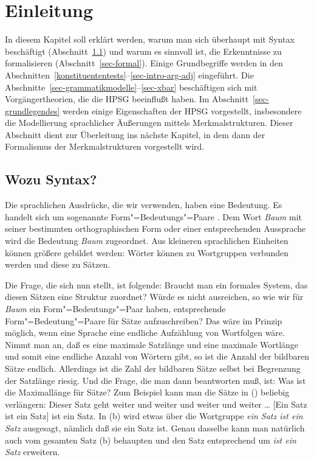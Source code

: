 

\chapter{Einleitung}

In diesem Kapitel soll erklärt werden, warum man sich überhaupt mit Syntax
beschäftigt (Abschnitt~\ref{sec-wozu-syntax}) und 
warum es sinnvoll ist, die Erkenntnisse zu formalisieren (Abschnitt~\ref{sec-formal}).
Einige Grundbegriffe werden in den Abschnitten~\ref{konstituententests}--\ref{sec-intro-arg-adj} eingeführt. 
Die Abschnitte~\ref{sec-grammatikmodelle}--\ref{sec-xbar}
beschäftigen sich mit Vorgängertheorien, die die HPSG beeinflußt haben.
Im Abschnitt~\ref{sec-grundlegendes} werden einige Eigenschaften der HPSG
vorgestellt, insbesondere die Modellierung sprachlicher Äußerungen mittels
Merkmalstrukturen. Dieser Abschnitt dient zur Überleitung ins nächste Kapitel,
in dem dann der Formalismus der Merkmalstrukturen vorgestellt wird.

\section{Wozu Syntax?}
\label{sec-wozu-syntax}

Die sprachlichen Ausdrücke, die wir verwenden, haben eine Bedeutung. Es handelt
sich um sogenannte Form"=Bedeutungs"=Paare \citep{Saussure16a-de}. Dem Wort \emph{Baum}
mit seiner bestimmten orthographischen Form oder einer entsprechenden Aussprache
wird die Bedeutung \emph{Baum} zugeordnet. Aus kleineren sprachlichen Einheiten
können größere gebildet werden: Wörter können zu Wortgruppen verbunden werden
und diese zu Sätzen.

Die Frage, die sich nun stellt, ist folgende: Braucht man ein formales System, das
diesen Sätzen eine Struktur zuordnet? Würde es nicht ausreichen, so wie wir
für \emph{Baum} ein Form"=Bedeutungs"=Paar haben, entsprechende Form"=Bedeutung"=Paare
für Sätze aufzuschreiben? Das wäre im Prinzip möglich, wenn eine Sprache eine
endliche Aufzählung von Wortfolgen wäre. Nimmt man an,
daß es eine maximale Satzlänge und eine maximale Wortlänge und somit eine endliche
Anzahl von Wörtern gibt, so ist die Anzahl der bildbaren Sätze endlich.
Allerdings ist die Zahl der bildbaren Sätze selbst bei Begrenzung der Satzlänge riesig.
Und die Frage, die man dann beantworten muß, ist: Was ist die Maximallänge für
Sätze? Zum Beispiel kann man die Sätze in () beliebig verlängern:
\eal
\ex Dieser Satz geht weiter und weiter und weiter und weiter \ldots
\ex {}[Ein Satz ist ein Satz] ist ein Satz.
\zl
In (b) wird etwas über die Wortgruppe \emph{ein Satz ist ein Satz} ausgesagt, nämlich daß sie
ein Satz ist. Genau dasselbe kann man natürlich auch vom gesamten Satz (b) behaupten und den Satz
entsprechend um \emph{ist ein Satz} erweitern.

